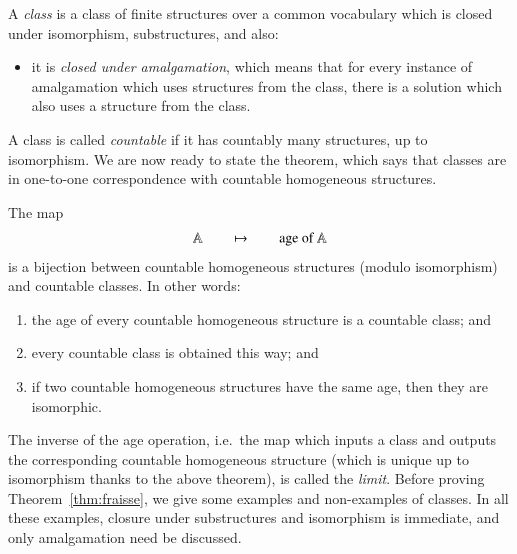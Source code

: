 \begin{definition}
A \emph{\fraisse class} is a class of finite structures over a common vocabulary which is closed under isomorphism, substructures, and also: 
\begin{itemize}
	\item it is \emph{closed under amalgamation}, which means that for every instance of amalgamation which uses structures from the class, there is a solution which also uses a structure from the class.
\end{itemize}
\end{definition}

A \fraisse class is called \emph{countable} if it has countably many structures, up to isomorphism. We are now ready to state the \fraisse theorem, which says that \fraisse classes are in one-to-one correspondence with countable homogeneous structures. 

\begin{theorem}
	\label{thm:fraisse}
	The map 
	\begin{align*}
	\mathbb A \qquad \mapsto \qquad \text{age of $\mathbb A$}
	\end{align*}
	is a bijection between countable homogeneous structures (modulo isomorphism) and countable \fraisse classes. In other words:
	\begin{enumerate}
		 \item \label{it:age-is-fraisse} the age of every countable homogeneous structure is a countable \fraisse class; and
		 \item \label{it:age-surjective} every countable \fraisse class is obtained this way; and
		 \item \label{it:age-injective} if two countable homogeneous structures have the same age, then they are isomorphic.
	\end{enumerate}
\end{theorem}

The inverse of the age operation, i.e.~the map which inputs a \fraisse class and outputs the corresponding countable homogeneous structure (which is unique up to isomorphism thanks to the above theorem), is called the \emph{\fraisse limit}. 
Before proving Theorem~\ref{thm:fraisse}, we give some examples and non-examples of \fraisse classes. In all these examples, closure under  substructures and isomorphism is immediate, and only amalgamation need be discussed. 
 

